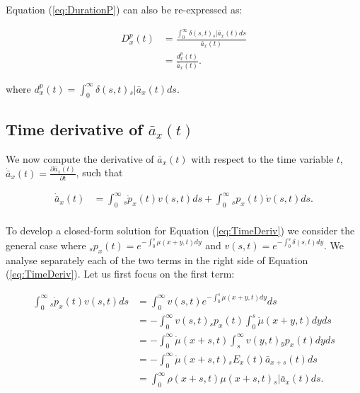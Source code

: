 \documentclass[12pt]{article}
\begin{document}
Equation (\ref{eq:DurationP}) can also be re-expressed as:

\begin{equation}\label{eq:DurationP2}
\begin{split}
{D}^{p}_{x}(t) &= \frac{\int_0^\infty \delta(s,t) {}_s|\bar{a}_x(t)ds} {\bar{a}_x(t)} \\
                 &= \frac{{d}^{p}_{x}(t)}{\bar{a}_x(t)}.
\end{split}
\end{equation}


where ${d}^{p}_{x}(t)=\int_0^\infty \delta(s,t) {}_s|\bar{a}_x(t) ds$. 




\subsection{Time derivative of $\bar{a}_x(t)$} \label{sec:timderiv}

We now compute the derivative of $\bar{a}_x(t)$ with respect to the time variable $t$, $\dot{\bar{a}} _x(t)=\frac{\partial \bar{a}_x(t)}{\partial t}$, such that

\begin{equation}\label{eq:TimeDeriv}
\begin{split}
\dot{\bar{a}} _x(t) &= \int_0^\infty {}_s\dot{p}_x(t) v(s,t)ds +\int_0^\infty {}_sp_x(t) \dot{v}(s,t)ds.\\
\end{split}
\end{equation}


To develop a closed-form solution for Equation (\ref{eq:TimeDeriv}) we consider the general case where $_sp_x(t)=e^{-\int_{0}^{s}\mu(x+y,t)dy}$ and ${v}(s,t)=e^{-\int_{0}^{s}\delta(s,t)dy}$. We analyse separately each of the two terms in the right side of Equation (\ref{eq:TimeDeriv}). Let us first focus on the first term:


\begin{equation}\label{eq:TimeDerivP1}
\begin{split}
\int_0^\infty {}_s\dot{p}_x(t) v(s,t)ds &= \int_0^\infty   v(s,t) e^{-\int_0^{s}\dot{\mu}(x+y,t)dy}ds\\
&= -\int_0^\infty   v(s,t) {}_sp_x(t)\int_0^{s}\dot{\mu}(x+y,t)dyds\\
&= -\int_0^\infty  \dot{\mu}(x+s,t) \int_s^{\infty} v(y,t) {}_yp_x(t) dyds\\
&= - \int_0^\infty \dot{\mu}(x+s,t)   {}_sE_x(t) \bar{a} _{x+s}(t) ds\\
&= \int_0^\infty \rho(x+s,t) \mu(x+s,t)   {}_s|\bar{a}_x(t) ds.\\
\end{split}
\end{equation}
\end{document}
